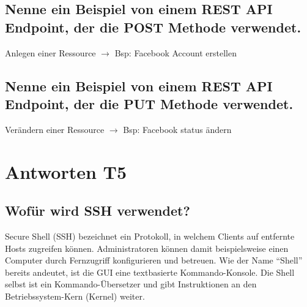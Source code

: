 \subsection*{Nenne ein Beispiel von einem REST API Endpoint, der die POST Methode verwendet.}
Anlegen einer Ressource $\rightarrow$ Bsp: Facebook Account erstellen

\subsection*{Nenne ein Beispiel von einem REST API Endpoint, der die PUT Methode verwendet.}
Verändern einer Ressource $\rightarrow$ Bsp: Facebook status ändern

\pagebreak
\section{Antworten T5}
\subsection*{Wofür wird SSH verwendet?}
Secure Shell (SSH) bezeichnet ein Protokoll, in welchem Clients auf entfernte Hosts zugreifen können. Administratoren können damit beispielsweise einen Computer durch Fernzugriff konfigurieren und betreuen. Wie der Name "`Shell"' bereits andeutet, ist die GUI eine textbasierte Kommando-Konsole. Die Shell selbst ist ein Kommando-Übersetzer und gibt Instruktionen an den Betriebssystem-Kern (Kernel) weiter.

